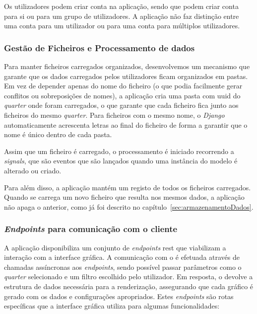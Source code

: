 Os utilizadores podem criar conta na aplicação, sendo que podem criar conta para si ou para um grupo de utilizadores. A aplicação não faz distinção entre uma conta para um utilizador ou para uma conta para múltiplos utilizadores.

\subsubsection{Gestão de Ficheiros e Processamento de dados}

Para manter ficheiros carregados organizados, desenvolvemos um mecanismo que garante que os dados carregados pelos utilizadores ficam organizados em pastas. Em vez de depender apenas do nome do ficheiro (o que podia facilmente gerar conflitos ou sobreposições de nomes), a aplicação cria uma pasta com \gls{uuid} do \textit{quarter} onde foram carregados, o que garante que cada ficheiro fica junto aos ficheiros do mesmo \textit{quarter}. Para ficheiros com o mesmo nome, o \textit{Django} automaticamente acrescenta letras ao final do ficheiro de forma a garantir que o nome é único dentro de cada pasta.

Assim que um ficheiro é carregado, o processamento é iniciado recorrendo a \textit{signals}, que são eventos que são lançados quando uma instância do modelo é alterado ou criado.

Para além disso, a aplicação mantém um registo de todos os ficheiros carregados. Quando se carrega um novo ficheiro que resulta nos mesmos dados, a aplicação não apaga o anterior, como já foi descrito no capítulo~\ref{sec:armazenamentoDados}. 

\subsubsection{\textit{Endpoints} para comunicação com o cliente}

A aplicação disponibiliza um conjunto de \textit{endpoints} \gls{rest} que viabilizam a interação com a interface gráfica. A comunicação com o  é efetuada através de chamadas assíncronas aos \textit{endpoints}, sendo possível passar parâmetros como o \textit{quarter} selecionado e um filtro escolhido pelo utilizador. Em resposta, o  devolve a estrutura de dados necessária para a renderização, assegurando que cada gráfico é gerado com os dados e configurações apropriados. Estes \textit{endpoints} são rotas específicas que a interface gráfica utiliza para algumas funcionalidades:

